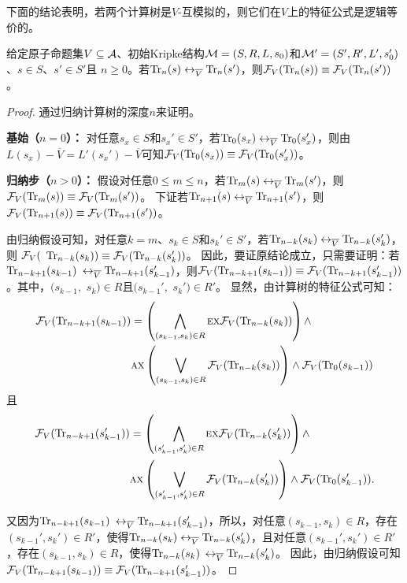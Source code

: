 下面的结论表明，若两个计算树是$V$-互模拟的，则它们在$V$上的特征公式是逻辑等价的。
\begin{lemma}\label{lem:Vb:TrFormula:Equ}
	给定原子命题集$V\subseteq {\cal A}$、初始Kripke结构${\cal M}=(S,R,L,s_0)$和${\cal M}'=(S',R',L',s_0')$、$s\in S$、$s'\in S'$且 $n\ge 0$。若$\textrm{Tr}_n(s) \leftrightarrow_{\overline V} \textrm{Tr}_n(s')$，则${\cal F}_V(\textrm{Tr}_n(s)) \equiv {\cal F}_V(\textrm{Tr}_n(s'))$。
\end{lemma}
\begin{proof}
	通过归纳计算树的深度$n$来证明。
	
	\textbf{基始（$n=0$）：} 对任意$s_x\in S$和$s_x' \in S'$，若$\textrm{Tr}_0(s_x) \leftrightarrow_{\overline V} \textrm{Tr}_0(s_x')$，则由$L(s_x) - \overline V = L'(s_x') - \overline V$可知${\cal F}_V(\textrm{Tr}_0(s_x)) \equiv {\cal F}_V(\textrm{Tr}_0(s_x'))$。
	
	\textbf{归纳步（$n>0$）：} 假设对任意$0\leq m \leq n$，若$\textrm{Tr}_m(s) \leftrightarrow_{\overline V} \textrm{Tr}_m(s')$，则${\cal F}_V(\textrm{Tr}_m(s)) \equiv {\cal F}_V(\textrm{Tr}_m(s'))$。
	下证若$\textrm{Tr}_{n+1}(s) \leftrightarrow_{\overline V} \textrm{Tr}_{n+1}(s')$，则${\cal F}_V(\textrm{Tr}_{n+1}(s)) \equiv {\cal F}_V(\textrm{Tr}_{n+1}(s'))$。
	
	由归纳假设可知，对任意$k=m$、$s_k\in S$和$s_k'\in S'$，若$\textrm{Tr}_{n-k}(s_k) \leftrightarrow_{\overline V} \textrm{Tr}_{n-k}(s_k')$，则 ${\cal F}_V($ $\textrm{Tr}_{n-k}(s_k)) \equiv {\cal F}_V(\textrm{Tr}_{n-k}(s_k'))$。
	因此，要证原结论成立，只需要证明：若$\textrm{Tr}_{n-k+1}(s_{k-1})$ $\leftrightarrow_{\overline V} \textrm{Tr}_{n-k+1}(s_{k-1}')$，则${\cal F}_V(\textrm{Tr}_{n-k+1}(s_{k-1})) \equiv {\cal F}_V(\textrm{Tr}_{n-k+1}(s_{k-1}'))$。其中，$(s_{k-1},$ $s_k)\in R$且$(s_{k-1}',$ $s_k')\in R'$。
	显然，由计算树的特征公式可知：
	\begin{align*}
		{\cal F}_V(\textrm{Tr}_{n-k+1}(s_{k-1})) &  =
		\left(\bigwedge_{(s_{k-1},s_k)\in R}
		\textsc{e} \textsc{x} {\cal F}_V(\textrm{Tr}_{n-k}(s_k))\right)
		\wedge \\
		&\textsc{a} \textsc{x}\left(\bigvee_{(s_{k-1},s_k)\in R}
		{\cal F}_V(\textrm{Tr}_{n-k}(s_k) )\right)
		\wedge {\cal F}_V(\textrm{Tr}_0(s_{k-1}))
	\end{align*}
	且
	\begin{align*}
		{\cal F}_V(\textrm{Tr}_{n-k+1}(s_{k-1}')) &  =
		\left(\bigwedge_{(s_{k-1}',s_k')\in R}
		\textsc{e} \textsc{x} {\cal F}_V(\textrm{Tr}_{n-k}(s_k'))\right)
		\wedge \\
		&\textsc{a} \textsc{x}\left(\bigvee_{(s_{k-1}',s_k')\in R}
		{\cal F}_V(\textrm{Tr}_{n-k}(s_k') )\right)
		\wedge {\cal F}_V(\textrm{Tr}_0(s_{k-1}')).
	\end{align*} 
	
	又因为$\textrm{Tr}_{n-k+1}(s_{k-1})$ $\leftrightarrow_{\overline V} \textrm{Tr}_{n-k+1}(s_{k-1}')$，所以，对任意$(s_{k-1}, s_k) \in R$，存在$(s_{k-1}', s_k') \in R'$，使得$\textrm{Tr}_{n-k}(s_k) \leftrightarrow_{\overline V} \textrm{Tr}_{n-k}(s_k')$，且对任意$(s_{k-1}', s_k') \in R'$，存在$(s_{k-1}, s_k) \in R$，使得$\textrm{Tr}_{n-k}(s_k)$ $ \leftrightarrow_{\overline V}\textrm{Tr}_{n-k}(s_k')$。
	因此，由归纳假设可知${\cal F}_V(\textrm{Tr}_{n-k+1}(s_{k-1})) \equiv {\cal F}_V(\textrm{Tr}_{n-k+1}(s_{k-1}'))$。
\end{proof}

